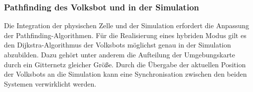 \subsubsection{Pathfinding des Volksbot und in der Simulation}

Die Integration der physischen Zelle und der Simulation erfordert die Anpassung der Pathfinding-Algorithmen. Für die Realisierung eines hybriden Modus gilt es den Dijkstra-Algorithmus der Volksbots möglichst genau in der Simulation abzubilden. Dazu gehört unter anderem die Aufteilung der Umgebungskarte durch ein Gitternetz gleicher Größe. Durch die Übergabe der aktuellen Position der Volksbots an die Simulation kann eine Synchronisation zwischen den beiden Systemen verwirklicht werden.  
